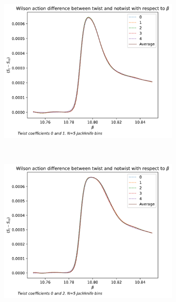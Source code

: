 \documentclass[english,twoside,openright]{UH_TCM_MSc}
\begin{document}
\begin{figure}[htpb]
\begin{subfigure}[t]{0.5\textwidth}
        \caption{}
    \end{subfigure}
    \begin{subfigure}[t]{0.5\textwidth}
        \centering
        \includegraphics[width=\textwidth]{final_plots/24_24_36_highlight/action_diff_0-1.pdf}
        \caption{}
    \end{subfigure}%
    ~ 
    \begin{subfigure}[t]{0.5\textwidth}
        \centering
        \includegraphics[width=\textwidth]{final_plots/24_24_36_highlight/action_diff_0-2.pdf}
        \caption{}
    \end{subfigure}

\end{figure}
\end{document}
